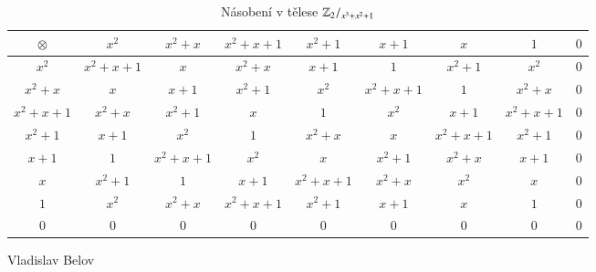 \documentclass[11pt,american,czech]{article}
\begin{document}
\begin{table}[h]
\begin{threeparttable}
\caption{Násobení v tělese $\Bbb{Z}_{\small 2}/_{x^3+x^2+1}$}
\begin{tabular}{|c||c|c|c|c|c|c|c| P{15mm} |}
\hline
$\otimes$ & $x^2$ & $x^2+x$ & $x^2+x+1$ & $x^2+1$ & $x+1$ & $x$ & $1$ & $0$ \\ \hline \hline
$x^2$ & $x^2+x+1$ & $x$ & $x^2+x$ & $x+1$ & $1$ & $x^2+1$ & $x^2$ & $0$ \\ \hline
$x^2+x$ & $x$ & $x+1$ & $x^2+1$ & $x^2$ & $x^2+x+1$ & $1$ & $x^2+x$ & $0$ \\ \hline
$x^2+x+1$ & $x^2+x$ & $x^2+1$ & $x$ & $1$ & $x^2$ & $x+1$ & $x^2+x+1$ & $0$ \\ \hline
$x^2+1$ & $x+1$ & $x^2$ & $1$ & $x^2+x$ & $x$ & $x^2+x+1$ & $x^2+1$ & $0$ \\ \hline
$x+1$ & $1$ & $x^2+x+1$ & $x^2$ & $x$ & $x^2+1$ & $x^2+x$ & $x+1$ & $0$ \\ \hline
$x$ & $x^2+1$ & $1$ & $x+1$ & $x^2+x+1$ & $x^2+x$ & $x^2$ & $x$ & $0$ \\ \hline
$1$ & $x^2$ & $x^2+x$ & $x^2+x+1$ & $x^2+1$ & $x+1$ & $x$ & $1$ & $0$ \\ \hline
$0$ & $0$ & $0$ & $0$ & $0$ & $0$ & $0$ & $0$ & $0$ \\ \hline
\end{tabular} 
\end{threeparttable} 
\end{table}


\vfill
\begin{flushright}
Vladislav Belov
\end{flushright}
\pagebreak
\end{document}
